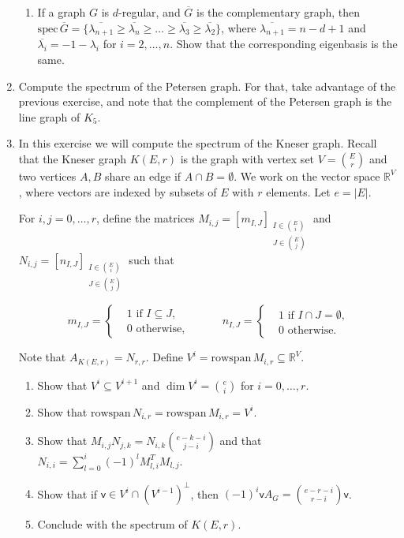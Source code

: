 \documentclass[kulak]{tplt}
\theoremstyle{definition}
\newcommand{\R}{\mathbb{R}}
\newcommand{\vv}{\mathsf{v}}
\newcommand{\rowspn}{\mathrm{rowspan}}
\newcommand{\spec}{\mathrm{spec}}
\begin{document}
\begin{enumerate}
\begin{enumerate}
\item If a graph $G$ is $d$-regular, and $\overline{G}$ is the complementary graph, then $\spec \, \overline{G} = \{ \overline{\lambda_{n+1}} \geq  \overline{\lambda_{n}} \geq  \ldots \geq  \overline{\lambda_{3}} \geq  \overline{\lambda_{2}} \}$, where $\overline{\lambda_{n+1}} = n - d + 1$ and $\overline{\lambda_i} = - 1 - \lambda _ i$ for $i = 2, \ldots, n$.
Show that the corresponding eigenbasis is the same.
\end{enumerate}


\item Compute the spectrum of the Petersen graph.
For that, take advantage of the previous exercise, and note that the complement of the Petersen graph is the line graph of $K_5$.

\item In this exercise we will compute the spectrum of the Kneser graph.
Recall that the Kneser graph $K(E, r)$ is the graph with vertex set $V = \binom{E}{r}$ and two vertices $A, B$ share an edge if $A \cap B = \emptyset$.
We work on the vector space $\R^V$, where vectors are indexed by subsets of $E$ with $r$ elements.
Let $e = |E|$.

For $i, j = 0, \ldots, r$, define the matrices $M_{i, j} = [m_{I, J}]_{\substack{I\in \binom{E}{i} \\ J \in \binom{E}{j}}}$ and $N_{i, j} = [n_{I, J}]_{\substack{I\in \binom{E}{i} \\ J \in \binom{E}{j}}}$ such that 

$$ m_{I, J} =\begin{cases*}
      & 1 \text{ if $I \subseteq J$,}\\
      & 0 \text{ otherwise,}
    \end{cases*}  \quad \quad \quad 
     n_{I, J} =\begin{cases*}
      & 1 \text{ if $I \cap J = \emptyset $,}\\
      & 0 \text{ otherwise.}
    \end{cases*}  $$

Note that $A_{K(E, r)} = N_{r, r}$.
Define $V^i = \rowspn \, M_{i, r} \subseteq \R^V$.

\begin{enumerate}
\item Show that $V^i \subseteq V^{i+1}$ and $\dim V^i = \binom{e}{i}$ for $i=0, \ldots, r$.

\item Show that $\rowspn \, N_{i, r} = \rowspn \, M_{i, r} = V^i$.

\item Show that $M_{i, j} N_{j, k} = N_{i, k} \binom{e - k - i}{j-i}$ and that $N_{i, i} = \sum_{l=0}^i (-1)^l M_{l, i}^TM_{l, j}$.

\item Show that if $\vv \in V^i \cap (V^{i-1})^{\perp}$, then $(-1)^i \vv A_G = \binom{e-r-i}{r-i} \vv $.

\item Conclude with the spectrum of $K(E, r)$.
\end{enumerate}
\end{enumerate}
\end{document}
